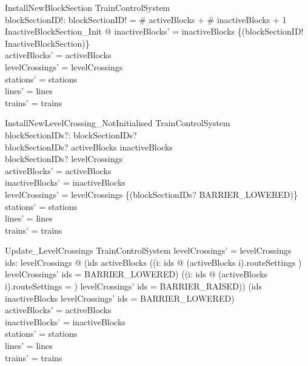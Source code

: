 \begin{schema}{InstallNewBlockSection}
  \Delta TrainControlSystem\\
  blockSectionID!: \nat 
\where
  blockSectionID! = \# activeBlocks + \# inactiveBlocks + 1\\
  \exists  InactiveBlockSection\_Init @ inactiveBlocks' = inactiveBlocks \oplus  \{(blockSectionID! \mapsto  \theta  InactiveBlockSection)\}\\
  activeBlocks' = activeBlocks\\
  levelCrossings' = levelCrossings\\
  stations' = stations\\
  lines' = lines\\
  trains' = trains
\end{schema}

\begin{schema}{InstallNewLevelCrossing\_NotInitialised}
  \Delta TrainControlSystem\\
  blockSectionIDs?: \finset  \nat 
\where
  blockSectionIDs? \neq  \emptyset\\
  blockSectionIDs? \subseteq  \dom  activeBlocks \cup  \dom  inactiveBlocks\\
  blockSectionIDs? \notin  \dom  levelCrossings\\
  activeBlocks' = activeBlocks\\
  inactiveBlocks' = inactiveBlocks\\
  levelCrossings' = levelCrossings \oplus  \{(blockSectionIDs? \mapsto  BARRIER\_LOWERED)\}\\
  stations' = stations\\
  lines' = lines\\
  trains' = trains
\end{schema}

\begin{schema}{Update\_LevelCrossings}
  \Delta TrainControlSystem
\where
  \dom  levelCrossings' = \dom  levelCrossings\\
  \forall  ids: \dom  levelCrossings @ (ids \subseteq  \dom  activeBlocks \implies  ((\exists  i: ids @ (activeBlocks i).routeSettings \neq  \emptyset) \implies  levelCrossings' ids = BARRIER\_LOWERED) \land  ((\forall  i: ids @ (activeBlocks i).routeSettings = \emptyset) \implies  levelCrossings' ids = BARRIER\_RAISED)) \land  (ids \cap  \dom  inactiveBlocks \neq  \emptyset \implies  levelCrossings' ids = BARRIER\_LOWERED)\\
  activeBlocks' = activeBlocks\\
  inactiveBlocks' = inactiveBlocks\\
  stations' = stations\\
  lines' = lines\\
  trains' = trains
\end{schema}

